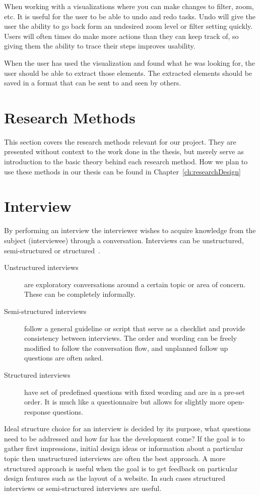 When working with a visualizations where you can make changes to filter, zoom, etc. It is useful for the user to be able to undo and redo tasks. Undo will give the user the ability to go back form an undesired zoom level or filter setting quickly. Users will often times do make more actions than they can keep track of, so giving them the ability to trace their steps improves usability.

When the user has used the visualization and found what he was looking for, the user should be able to extract those elements. The extracted elements should be saved in a format that can be sent to and seen by others. 

\section{Research Methods}
This section covers the research methods relevant for our project. They are presented without context to the work done in the thesis, but merely serve as introduction to the basic theory behind each research method. How we plan to use these methods in our thesis can be found in Chapter~\ref{ch:researchDesign}

\section{Interview}
By performing an interview the interviewer wishes to acquire knowledge from the subject (interviewee) through a conversation. Interviews can be unstructured, semi-structured or structured~\cite{interactionDesign}.
\begin{description}
  \item[Unstructured interviews] are exploratory conversations around a certain topic or area of concern. These can be completely informally.
  \item[Semi-structured interviews] follow a general guideline or script that serve as a checklist and provide consistency between interviews. The order and wording can be freely modified to follow the conversation flow, and unplanned follow up questions are often asked.
  \item[Structured interviews] have set of predefined questions with fixed wording and are in a pre-set order. It is much like a questionnaire but allows for slightly more open-response questions.
\end{description}

Ideal structure choice for an interview is decided by its purpose, what questions need to be addressed and how far has the development come? If the goal is to gather first impressions, initial design ideas or information about a particular topic then unstructured interviews are often the best approach. A more structured approach is useful when the goal is to get feedback on particular design features such as the layout of a website. In such cases structured interviews or semi-structured interviews are useful.

